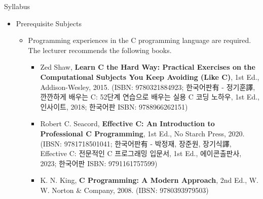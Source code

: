 \begin{frame}{Syllabus}
  \begin{itemize}
  \item Prerequisite Subjects
    \begin{itemize}
      \item Programming experiences in the C programming language are required. The lecturer recommends the following books.
      \begin{itemize}
        \item Zed Shaw, \textbf{Learn C the Hard Way: Practical Exercises on the Computational Subjects You Keep Avoiding (Like C)}, 1st Ed., Addison-Wesley, 2015. (ISBN: 9780321884923; 한국어판有 - 정기훈譯, 깐깐하게 배우는 C: 52단계 연습으로 배우는 실용 C 코딩 노하우, 1st Ed., 인사이트, 2018; 한국어판 ISBN: 9788966262151)
        \item Robert C. Seacord, \textbf{Effective C: An Introduction to Professional C Programming}, 1st Ed., No Starch Press, 2020. (IBSN: 9781718501041; 한국어판有 - 박정재, 장준원, 장기식譯, Effective C: 전문적인 C 프로그래밍 입문서, 1st Ed., 에이콘출판사, 2023; 한국어판 ISBN: 9791161757599)
        \item K. N. King, \textbf{C Programming: A Modern Approach}, 2nd Ed., W. W. Norton \& Company, 2008. (IBSN: 9780393979503)
      \end{itemize}
    \end{itemize}
  \end{itemize}
\end{frame}

